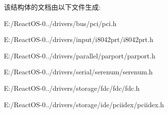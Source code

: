 该结构体的文档由以下文件生成\+:\begin{DoxyCompactItemize}
\item 
E\+:/\+React\+O\+S-\/0../drivers/bus/pci/pci.\+h\item 
E\+:/\+React\+O\+S-\/0../drivers/input/i8042prt/i8042prt.\+h\item 
E\+:/\+React\+O\+S-\/0../drivers/parallel/parport/parport.\+h\item 
E\+:/\+React\+O\+S-\/0../drivers/serial/serenum/serenum.\+h\item 
E\+:/\+React\+O\+S-\/0../drivers/storage/fdc/fdc/fdc.\+h\item 
E\+:/\+React\+O\+S-\/0../drivers/storage/ide/pciidex/pciidex.\+h\end{DoxyCompactItemize}
